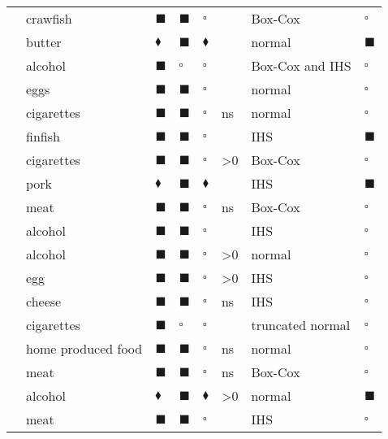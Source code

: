 \begin{table}
\begin{threeparttable}
\begin{center}
\begin{footnotesize}
\begin{tabular}{llllllll}
  \cite{YEN:DELL:SCHUP:95} & crawfish & $\blacksquare$ & $\blacksquare$ & $\square$ &  & Box-Cox & $\square$ \\ 
  \cite{YEN:SU:95} & butter & $\blacklozenge$ & $\blacksquare$ & $\blacklozenge$ &  & normal & $\blacksquare$ \\ 
  \cite{YEN:95} & alcohol & $\blacksquare$ & $\square$ & $\square$ &  & Box-Cox and IHS & $\square$ \\ 
  \cite{WANG:JENS:YEN:96} & eggs & $\blacksquare$ & $\blacksquare$ & $\square$ &  & normal & $\square$ \\ 
  \cite{GARC:LABE:96} & cigarettes & $\blacksquare$ & $\blacksquare$ & $\square$ & ns & normal & $\square$ \\ 
  \cite{YEN:HUAN:96} & finfish & $\blacksquare$ & $\blacksquare$ & $\square$ &  & IHS & $\blacksquare$ \\ 
  \cite{YEN:JONE:96} & cigarettes & $\blacksquare$ & $\blacksquare$ & $\square$ & >0 & Box-Cox & $\square$ \\ 
  \cite{SU:YEN:96} & pork & $\blacklozenge$ & $\blacksquare$ & $\blacklozenge$ &  & IHS & $\blacksquare$ \\ 
  \cite{BURT:DORS:YOUN:96} & meat & $\blacksquare$ & $\blacksquare$ & $\square$ & ns & Box-Cox & $\square$ \\ 
  \cite{YEN:JENS:96} & alcohol & $\blacksquare$ & $\blacksquare$ & $\square$ &  & IHS & $\square$ \\ 
  \cite{WANG:GAO:WAIL:96} & alcohol & $\blacksquare$ & $\blacksquare$ & $\square$ & >0 & normal & $\square$ \\ 
  \cite{YEN:JENS:WANG:96} & egg & $\blacksquare$ & $\blacksquare$ & $\square$ & >0 & IHS & $\square$ \\ 
  \cite{YEN:JONE:97} & cheese & $\blacksquare$ & $\blacksquare$ & $\square$ & ns & IHS & $\square$ \\ 
  \cite{YEN:99} & cigarettes & $\blacksquare$ & $\square$ & $\square$ &  & truncated normal & $\square$ \\ 
  \cite{BERT:CAIL:NICH:99} & home produced food & $\blacksquare$ & $\blacksquare$ & $\square$ & ns & normal & $\square$ \\ 
  \cite{BURT:YOUN:00} & meat & $\blacksquare$ & $\blacksquare$ & $\square$ & ns & Box-Cox & $\square$ \\ 
  \cite{ANGU:GIL:GRAC:01} & alcohol & $\blacklozenge$ & $\blacksquare$ & $\blacklozenge$ & >0 & normal & $\blacksquare$ \\ 
  \cite{NEWM:HENC:MATT:01} & meat & $\blacksquare$ & $\blacksquare$ & $\square$ &  & IHS & $\square$ \\ 

\end{tabular}
\end{footnotesize}
\end{center}
\end{threeparttable}
\end{table}
